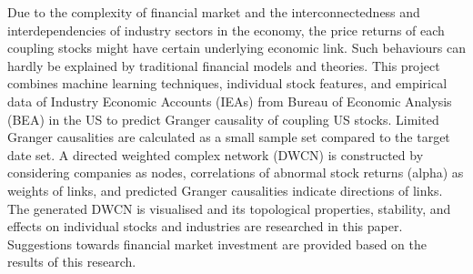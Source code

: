 \abstracttitle
%
{\singlespacing
Due to the complexity of financial market and the interconnectedness and interdependencies of industry sectors in the economy, the price returns of each coupling stocks might have certain underlying economic link. Such behaviours can hardly be explained by traditional financial models and theories. This project combines machine learning techniques, individual stock features, and empirical data of Industry Economic Accounts (IEAs) from Bureau of Economic Analysis (BEA) in the US to predict Granger causality of coupling US stocks. Limited Granger causalities are calculated as a small sample set compared to the target date set. A directed weighted complex network (DWCN) is constructed by considering companies as nodes, correlations of abnormal stock returns (alpha) as weights of links, and predicted Granger causalities indicate directions of links. The generated DWCN is visualised and its topological properties, stability, and effects on individual stocks and industries are researched in this paper. Suggestions towards financial market investment are provided based on the results of this research.
}

